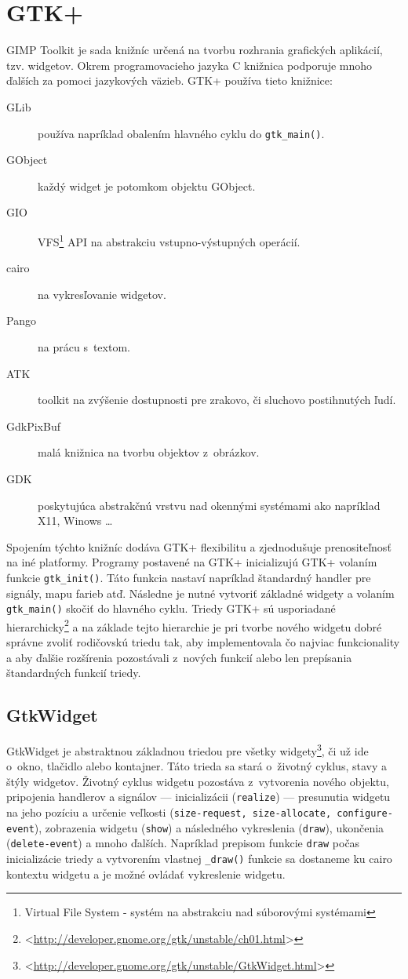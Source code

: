 \documentclass[12pt,oneside,final]{fithesis2}
\begin{document}
\section{GTK+}
GIMP Toolkit je sada knižníc určená na tvorbu rozhrania grafických aplikácií, tzv. widgetov. Okrem programovacieho jazyka C knižnica podporuje mnoho ďalších za pomoci jazykových väzieb. GTK+ používa tieto knižnice:
\begin{description}
\item[GLib] používa napríklad obalením hlavného cyklu do \texttt{gtk\_main()}.
\item[GObject] každý widget je potomkom objektu GObject.
\item[GIO] VFS\footnote{Virtual File System - systém na abstrakciu nad súborovými systémami} API na abstrakciu vstupno-výstupných operácií.
\item[cairo] na vykresľovanie widgetov.
\item[Pango] na prácu s~textom.
\item[ATK] toolkit na zvýšenie dostupnosti pre zrakovo, či sluchovo postihnutých ľudí.
\item[GdkPixBuf] malá knižnica na tvorbu objektov z~obrázkov.
\item[GDK] poskytujúca abstrakčnú vrstvu nad okennými systémami ako napríklad X11, Winows \dots
\end{description}
Spojením týchto knižníc dodáva GTK+ flexibilitu a zjednodušuje prenositeľnosť na iné platformy.
Programy postavené na GTK+ inicializujú GTK+ volaním funkcie \texttt{gtk\_init()}. Táto funkcia nastaví napríklad štandardný handler pre signály, mapu farieb atď. Následne je nutné vytvoriť základné widgety a volaním \texttt{gtk\_main()} skočiť do hlavného cyklu. Triedy GTK+ sú usporiadané hierarchicky\footnote{<\url{http://developer.gnome.org/gtk/unstable/ch01.html}>} a na základe tejto hierarchie je pri tvorbe nového widgetu dobré správne zvoliť rodičovskú triedu tak, aby implementovala čo najviac funkcionality a aby ďalšie rozšírenia pozostávali z~nových funkcií alebo len prepísania štandardných funkcií triedy.
\subsection{GtkWidget}
GtkWidget je abstraktnou základnou triedou pre všetky widgety\footnote{<\url{http://developer.gnome.org/gtk/unstable/GtkWidget.html}>}, či už ide o~okno, tlačidlo alebo kontajner. Táto trieda sa stará o~životný cyklus, stavy a štýly widgetov. Životný cyklus widgetu pozostáva z~vytvorenia nového objektu, pripojenia handlerov a signálov --- inicializácii (\texttt{realize}) --- presunutia widgetu na jeho pozíciu a určenie veľkosti (\texttt{size-request, size-allocate, configure-event}), zobrazenia widgetu (\texttt{show}) a následného vykreslenia (\texttt{draw}), ukončenia (\texttt{delete-event}) a mnoho ďalších. Napríklad prepisom funkcie \texttt{draw} počas inicializácie triedy a vytvorením vlastnej \texttt{\_draw()} funkcie sa dostaneme ku cairo kontextu widgetu a je možné ovládať vykreslenie widgetu.
\end{document}

